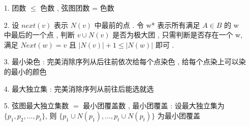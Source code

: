 \begin{enumerate}
\item[1.] 团数 $\leq$ 色数 , 弦图团数 = 色数

\item[2.] 设 $next(v)$ 表示 $N(v)$ 中最前的点 . 
令 w* 表示所有满足 $A \in B$ 的 w 中最后的一个点 , 
判断 $v \cup N(v)$ 是否为极大团 , 
只需判断是否存在一个 w, 
满足 $Next(w)=v$ 且 $|N(v)| + 1 \leq |N(w)|$ 即可 . 

\item[3.] 最小染色 : 完美消除序列从后往前依次给每个点染色 , 
给每个点染上可以染的最小的颜色

\item[4.] 最大独立集 : 完美消除序列从前往后能选就选

\item[5.] 弦图最大独立集数 $=$ 最小团覆盖数 , 
最小团覆盖 : 
设最大独立集为 $\{p_1,p_2, \dots ,p_t\}$, 
则 $\{p_1\cup N(p_1), \dots , p_t \cup N(p_t)\}$ 
为最小团覆盖
\end{enumerate}
